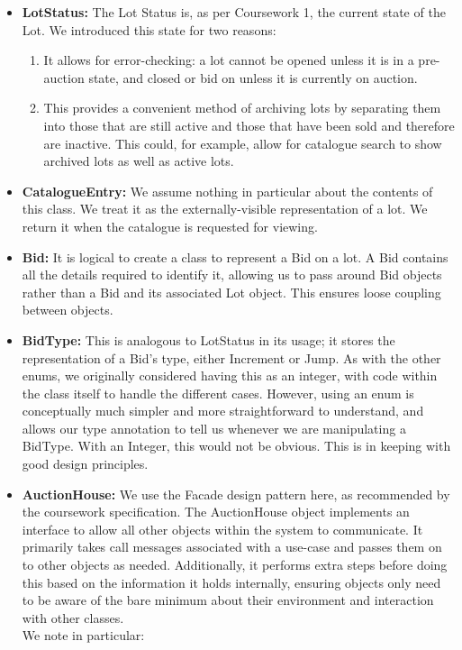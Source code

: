 \documentclass[titlepage, 12pt]{extarticle}
\begin{document}
\begin{itemize}
\item {\bf LotStatus: } The Lot Status is, as per Coursework 1, the current state of the Lot. We introduced this state for two reasons:
  \begin{enumerate}
    \item It allows for error-checking: a lot cannot be opened unless it is in a pre-auction state, and closed or bid on unless it is currently on auction.
    \item This provides a convenient method of archiving lots by separating them into those that are still active and those that have been sold and therefore are inactive. This could, for example, allow for catalogue search to show archived lots as well as active lots.
  \end{enumerate}
\item {\bf CatalogueEntry: } We assume nothing in particular about the contents of this class. We treat it as the externally-visible representation of a lot. We return it when the catalogue is requested for viewing. 
\item {\bf Bid: } It is logical to create a class to represent a Bid on a lot. A Bid contains all the details required to identify it, allowing us to pass around Bid objects rather than a Bid and its associated Lot object. This ensures loose coupling between objects.
\item {\bf BidType: } This is analogous to LotStatus in its usage; it stores the representation of a Bid's type, either Increment or Jump. As with the other enums, we originally considered having this as an integer, with code within the class itself to handle the different cases. However, using an enum is conceptually much simpler and more straightforward to understand, and allows our type annotation to tell us whenever we are manipulating a BidType. With an Integer, this would not be obvious. This is in keeping with good design principles.
\item {\bf AuctionHouse: } We use the Facade design pattern here, as recommended by the coursework specification. The AuctionHouse object implements an interface to allow all other objects within the system to communicate. It primarily takes call messages associated with a use-case and passes them on to other objects as needed. Additionally, it performs extra steps before doing this based on the information it holds internally, ensuring objects only need to be aware of the bare minimum about their environment and interaction with other classes.
  \\ We note in particular:

\end{itemize}
\end{document}
